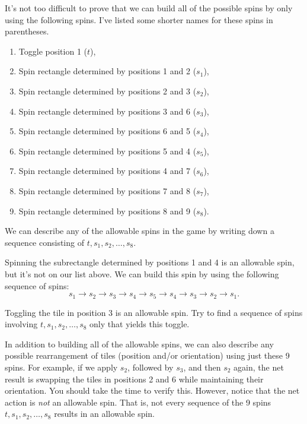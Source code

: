 It's not too difficult to prove that we can build all of the possible spins by only using the following spins.  I've listed some shorter names for these spins in parentheses.
\begin{enumerate}
\item Toggle position 1 ($t$),
\item Spin rectangle determined by positions 1 and 2 ($s_1$),
\item Spin rectangle determined by positions 2 and 3 ($s_2$),
\item Spin rectangle determined by positions 3 and 6 ($s_3$),
\item Spin rectangle determined by positions 6 and 5 ($s_4$),
\item Spin rectangle determined by positions 5 and 4 ($s_5$),
\item Spin rectangle determined by positions 4 and 7 ($s_6$),
\item Spin rectangle determined by positions 7 and 8 ($s_7$),
\item Spin rectangle determined by positions 8 and 9 ($s_8$).
\end{enumerate}
We can describe any of the allowable spins in the game by writing down a sequence consisting of $t,s_1, s_2,\ldots, s_8$.

\begin{example}
Spinning the subrectangle determined by positions 1 and 4 is an allowable spin, but it's not on our list above. We can build this spin by using the following sequence of spins: 
\[
s_1\to s_2\to s_3\to s_4\to s_5\to s_4\to s_3\to s_2\to s_1.
\]
\end{example}

\begin{exercise}\label{exer:toggle}
Toggling the tile in position 3 is an allowable spin. Try to find a sequence of spins involving $t, s_1, s_2, \ldots, s_8$ only that yields this toggle.
\end{exercise}

In addition to building all of the allowable spins, we can also describe any possible rearrangement of tiles (position and/or orientation) using just these 9 spins.  For example, if we apply $s_2$, followed by $s_3$, and then $s_2$ again, the net result is swapping the tiles in positions 2 and 6 while maintaining their orientation.  You should take the time to verify this. However, notice that the net action is \emph{not} an allowable spin.  That is, not every sequence of the 9 spins $t, s_1, s_2,\ldots, s_8$ results in an allowable spin.  


